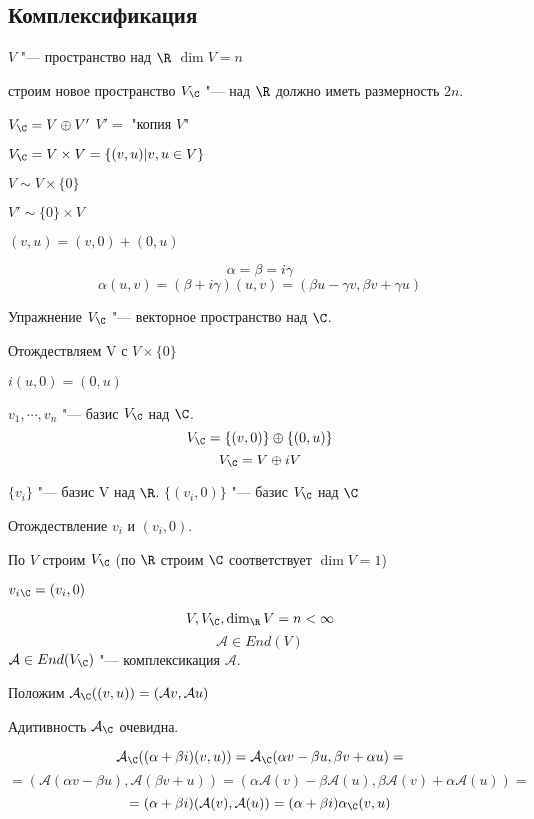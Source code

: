 \subsection{Комплексификация} 

$V$ "--- пространство над $\R$  $\dim V = n$

строим новое пространство $V_{\C}$ "--- над  $\R$ должно иметь размерность $2n$.

$V_{\C} = V \oplus V'$ 
$V' = $ "копия $V$"

$V_{\C} = V \times V = \{(v, u)| v, u \in V\}$

$V \sim V \times \{0\}$

$V' \sim \{0\} \times V$ 

$(v, u) = (v, 0) + (0, u)$

$$\alpha = \beta = i \gamma$$
$$\alpha(u, v) = (\beta + i \gamma)(u, v) = (\beta u - \gamma v, \beta v + \gamma u)$$

Упражнение $V_{\C}$ "--- векторное пространство над $\C$.

Отождествляем V с $V \times \{0\}$

$i(u, 0) = (0, u)$

$v_1, \cdots, v_n$ "--- базис $V_{\C}$ над $\C$.
$$V_{\C} = \{(v, 0)\} \oplus \{(0, u)\} $$
$$V_{\C} = V \oplus iV$$

$\{v_i\}$ "--- базис V над $\R$.
$\{(v_i, 0)\}$ "--- базис $V_{\C}$ над $\C$

Отождествление $v_i$ и $(v_i, 0)$.

По $V$ строим $V_{\C}$ (по $\R$ строим $\C$ соответствует $\dim V = 1$)

$v_i{_{\C}} = (v_i,0)$

\begin{Def}
$$V, V_{\C}, \dim_{\R}V = n < \infty$$
$$\mathcal{A} \in End(V)$$
$\mathcal{A} \in End(V_{\C})$ "--- комплексикация $\mathcal{A}$.
\end{Def}

Положим $\mathcal{A}_{\C}((v, u)) = (\mathcal{A}v, \mathcal{A}u)$

Адитивность $\mathcal{A}_{\C}$ очевидна.

$$\mathcal{A}_{\C}((\alpha + \beta i)(v, u)) = \mathcal{A}_{\C}(\alpha v - \beta u, \beta v + \alpha u) = $$
$$= (\mathcal{A}(\alpha v - \beta u), \mathcal{A}(\beta v + u)) = (\alpha \mathcal{A}(v) - \beta \mathcal{A}(u), \beta \mathcal{A}(v) + \alpha \mathcal{A}(u)) = $$
$$= (\alpha + \beta i)(\mathcal{A}(v), \mathcal{A}(u)) = (\alpha + \beta i)\alpha_{\C}(v, u)$$

